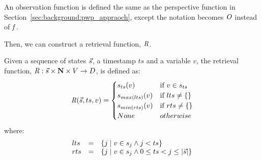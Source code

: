 An observation function is defined the same as the perspective function in Section~\ref{sec:background:pwp_appraoch}, except the notation becomes $\mathit{O}$ instead of $\mathit{f}$.

\noindent
Then, we can construct a retrieval function, $\mathit{R}$.


\begin{definition}
\label{def:memorization_function}
    Given a sequence of states  $\Vec{s}$, a timestamp $ts$ and a variable $v$, the retrieval function, $\mathit{R}: \Vec{s} \times \mathbf{N} \times V \rightarrow D$, is defined as:
    \[
    \mathit{R}(\Vec{s},ts,v) = 
    \begin{cases}
        s_{ts}(v) & \text{if } v \in s_{ts}\\
        s_{max(lts)}(v) & \text{if } lts \neq \{\}\\
        s_{min(rts)}(v) & \text{if } rts \neq \{\} \\
        None &  otherwise
    \end{cases}
    \]
    where:
    \[
    \begin{array}{lll}
    lts & = & \{j \mid v \in s_j \land j < ts\}\\
    rts & = & \{j \mid v \in s_j \land 0 \leq ts < j \leq |\Vec{s}|\}
    \end{array}
    \]
\end{definition}



